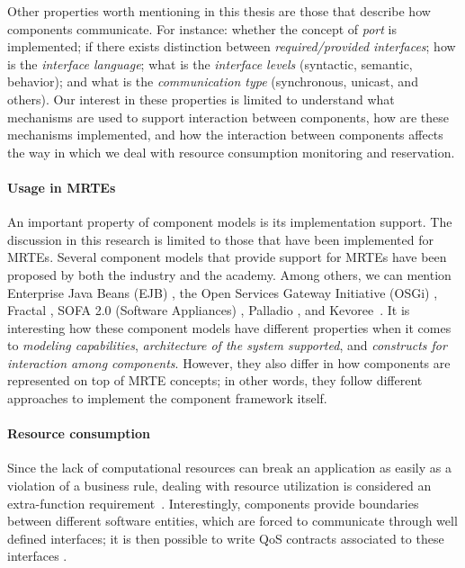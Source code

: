 Other properties worth mentioning in this thesis are those that describe how components communicate.
For instance:  whether the concept of \textit{port} is implemented; if there exists distinction between \textit{required/provided interfaces}; how is the \textit{interface language}; what is the \textit{interface levels} (syntactic, semantic, behavior); and what is the \textit{communication type} (synchronous, unicast, and others).
Our interest in these properties is limited to understand what mechanisms are used to support interaction between components, how are these mechanisms implemented, and how the interaction between components affects the way in which we deal with resource consumption monitoring and reservation.

\paragraph{Usage in MRTEs}
An important property of component models is its implementation support.
The discussion in this research is limited to those that have been implemented for MRTEs.
Several component models that provide support for MRTEs have been proposed by both the industry and the academy.
Among others, we can mention Enterprise Java Beans (EJB) \cite{OracleEJB3.0}, the Open Services Gateway Initiative (OSGi) \cite{OSGI:r5}, 
Fractal \cite{Bruneton:2006:FCM:1152333.1152345}, 
SOFA 2.0 (Software Appliances) \cite{Bures2006}, Palladio \cite{}, and Kevoree~\cite{morin09a,leger2010reliable}.
It is interesting how these component models have different properties when it comes to \textit{modeling capabilities}, \textit{architecture of the system supported}, and \textit{constructs for interaction among components}.
However, they also differ in how components are represented on top of MRTE concepts; in other words, they follow different approaches to implement the component framework itself.

\paragraph{Resource consumption}

Since the lack of computational resources can break an application as easily as a violation of a business rule, dealing with resource utilization is considered an extra-function requirement~\cite{}.
Interestingly, components provide boundaries between different software entities, which are forced to communicate through well defined interfaces; it is then possible to write QoS contracts associated to these interfaces \cite{Beugnard774917}.

